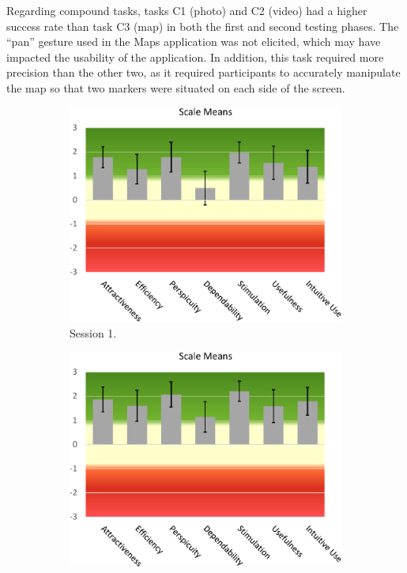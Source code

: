 Regarding compound tasks, tasks C1 (photo) and C2 (video) had a higher success rate than task C3 (map) in both the first and second testing phases. The ``pan'' gesture used in the Maps application was not elicited, which may have impacted the usability of the application. In addition, this task required more precision than the other two, as it required participants to accurately manipulate the map so that two markers were situated on each side of the screen.

\begin{figure}[bt]
    \centering
    \begin{subfigure}{.495\linewidth}
        \includegraphics[width=\linewidth]{Figures/LUI/Evaluation/ueq+_session_1_scale_means.pdf}
        \caption{Session 1.}
        \label{fig:lui:ueqplus-scales:session1}
    \end{subfigure}
    \begin{subfigure}{.495\linewidth}
        \includegraphics[width=\linewidth]{Figures/LUI/Evaluation/ueq+_session_2_scale_means.pdf}

\end{subfigure}
\end{figure}
